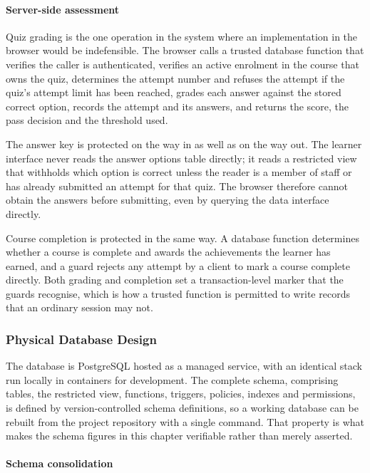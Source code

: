 \documentclass[12pt, oneside]{article} %
\begin{document}
\paragraph{Server-side assessment}

Quiz grading is the one operation in the system where an implementation in the browser would be indefensible. The browser calls a trusted database function that verifies the caller is authenticated, verifies an active enrolment in the course that owns the quiz, determines the attempt number and refuses the attempt if the quiz's attempt limit has been reached, grades each answer against the stored correct option, records the attempt and its answers, and returns the score, the pass decision and the threshold used.

The answer key is protected on the way in as well as on the way out. The learner interface never reads the answer options table directly; it reads a restricted view that withholds which option is correct unless the reader is a member of staff or has already submitted an attempt for that quiz. The browser therefore cannot obtain the answers before submitting, even by querying the data interface directly.

Course completion is protected in the same way. A database function determines whether a course is complete and awards the achievements the learner has earned, and a guard rejects any attempt by a client to mark a course complete directly. Both grading and completion set a transaction-level marker that the guards recognise, which is how a trusted function is permitted to write records that an ordinary session may not.

\subsubsection{Physical Database Design}
\label{sec:phys-db}

The database is PostgreSQL hosted as a managed service, with an identical stack run locally in containers for development. The complete schema, comprising tables, the restricted view, functions, triggers, policies, indexes and permissions, is defined by version-controlled schema definitions, so a working database can be rebuilt from the project repository with a single command. That property is what makes the schema figures in this chapter verifiable rather than merely asserted.

\paragraph{Schema consolidation}
\end{document}
